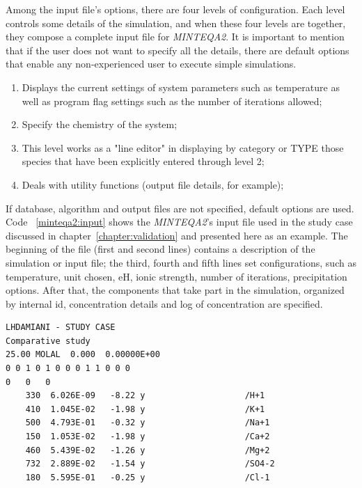 Among the input file's options, there are four levels of configuration. Each level controls some details of the simulation, and when these four levels are together, they compose a complete input file for \emph{MINTEQA2}. It is important to mention that if the user does not want to specify all the details, there are default options that enable any non-experienced user to execute simple simulations.
\begin{enumerate}
\item Displays the current settings of system parameters such as temperature as well as program flag settings such as the number of iterations allowed;
\item Specify the chemistry of the system;
\item This level works as a "line editor" in displaying by category or TYPE those species that have been explicitly entered through level 2;
\item Deals with utility functions (output file details, for example);
\end{enumerate}

If database, algorithm and output files are not specified, default options are used. Code ~\ref{minteqa2:input}  shows the \emph{MINTEQA2}'s input file used in the study case discussed in chapter~\ref{chapter:validation} and presented here as an example. The beginning of the file (first and second lines) contains a description of the simulation or input file; the third, fourth and fifth lines set configurations, such as temperature, unit chosen, eH, ionic strength, number of iterations, precipitation options. After that, the components that take part in the simulation, organized by internal id, concentration details and log of concentration are specified.

\begin{minipage}[c]{0.92\textwidth}
\begin{lstlisting}[frame=single, caption=\emph{MINTEQA2}'s input file, label=minteqa2:input]
LHDAMIANI - STUDY CASE
Comparative study           
25.00 MOLAL  0.000  0.00000E+00
0 0 1 0 1 0 0 0 1 1 0 0 0
0   0   0
    330  6.026E-09   -8.22 y                    /H+1               
    410  1.045E-02   -1.98 y                    /K+1               
    500  4.793E-01   -0.32 y                    /Na+1              
    150  1.053E-02   -1.98 y                    /Ca+2              
    460  5.439E-02   -1.26 y                    /Mg+2              
    732  2.889E-02   -1.54 y                    /SO4-2             
    180  5.595E-01   -0.25 y                    /Cl-1              

\end{lstlisting}
\end{minipage}



